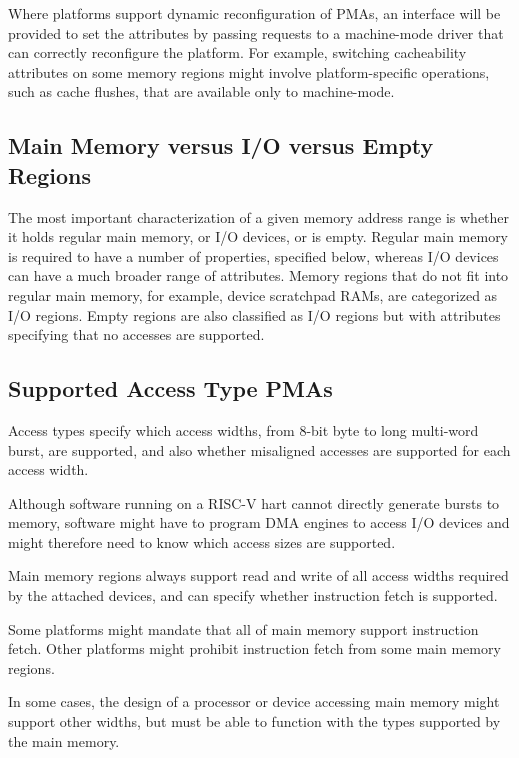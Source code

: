 Where platforms support dynamic reconfiguration of PMAs, an interface
will be provided to set the attributes by passing requests to a
machine-mode driver that can correctly reconfigure the platform.  For
example, switching cacheability attributes on some memory regions
might involve platform-specific operations, such as cache flushes,
that are available only to machine-mode.

\subsection{Main Memory versus I/O versus Empty Regions}

The most important characterization of a given memory address range is
whether it holds regular main memory, or I/O devices, or is empty.
Regular main memory is required to have a number of properties,
specified below, whereas I/O devices can have a much broader range of
attributes.  Memory regions that do not fit into regular main
memory, for example, device scratchpad RAMs, are categorized as I/O
regions.  Empty regions are also classified as I/O regions but with
attributes specifying that no accesses are supported.

\subsection{Supported Access Type PMAs}

Access types specify which access widths, from 8-bit byte to long
multi-word burst, are supported, and also whether misaligned accesses
are supported for each access width.

\begin{commentary}
Although software running on a RISC-V hart cannot directly generate
bursts to memory, software might have to program DMA engines to access
I/O devices and might therefore need to know which access sizes are
supported.
\end{commentary}

Main memory regions always support read and write of all
access widths required by the attached devices, and can
specify whether instruction fetch is supported.

\begin{commentary}
Some platforms might mandate that all of main memory support instruction
fetch.
Other platforms might prohibit instruction fetch from some main memory
regions.
\end{commentary}

\begin{commentary}
In some cases, the design of a processor or device accessing main
memory might support other widths, but must be able to function with
the types supported by the main memory.
\end{commentary}

